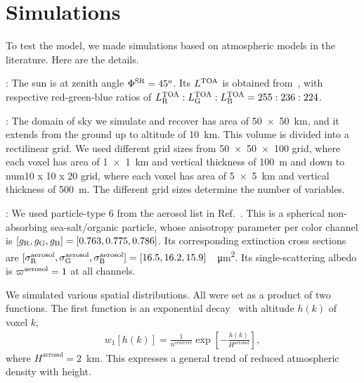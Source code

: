 \documentclass[10pt,letterpaper]{article}
\begin{document}
\section{Simulations}
\label{sec:simul}

To test the model, we made simulations based on atmospheric models in
the literature. Here are the details.

: The sun is at zenith angle $\Phi^{\rm
  SR}=45^o$. Its $L^{\rm TOA}$ is obtained
from~\cite{BBradiance,sun_composition}, with respective red-green-blue
ratios of $L^{\rm TOA}_{\rm R}:L^{\rm TOA}_{\rm G}:L^{\rm TOA}_{\rm
  B}=255:236:224$.

: The domain of sky we simulate and recover
has area of \SI{50 x 50}{\km}, and it extends from the ground up to
altitude of \SI{10}{\km}. This volume is divided into a rectilinear
grid. We used different grid sizes from \num{50 x 50 x 100} grid,
where each voxel has area of \SI{1 x 1}{\km} and vertical thickness of
\SI{100}{\metre} and down to num{10 x 10 x 20} grid, where each voxel
has area of \SI{5 x 5}{\km} and vertical thickness of
\SI{500}{\metre}. The different grid sizes determine the number of
variables.

: We used particle-type 6 from the aerosol list
in Ref.~\cite{Martonchik2009}. This is a spherical non-absorbing
sea-salt/organic particle, whose anisotropy parameter per color
channel is $[g_{\rm R},g_{\rm G},g_{\rm B}]=[0.763,0.775,0.786]$. Its
corresponding extinction cross sections are $[\sigma^{\rm
  aerosol}_{\rm R}, \sigma^{\rm aerosol}_{\rm G}, \sigma^{\rm
  aerosol}_{\rm
  B}]=[16.5,16.2,15.9]$~\si[sticky-per]{\per\micro\meter\squared}.
Its single-scattering albedo is $\varpi^{\rm aerosol}=1$ at all
channels.

We simulated various spatial distributions. All were set as a product
of two functions. The first function is an exponential
decay~\cite{Levi1980} with altitude $h(k)$ of voxel $k$,
\begin{align}
  w_1[h(k)] = \frac{1} {n^{sea level}}
  \exp\left[-\frac{h(k)}{H^\mathrm{aerosol}}\right],
\end{align}
where $H^\mathrm{aerosol}=2$~\si{\km}. This expresses a general trend
of reduced atmospheric density with height.
\end{document}
